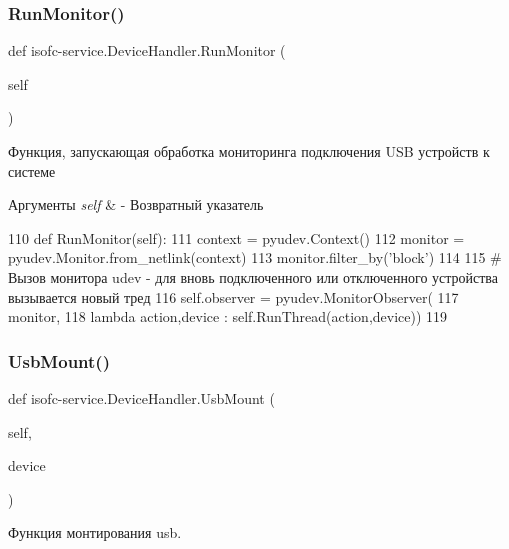 \subsubsection{\texorpdfstring{Run\+Monitor()}{RunMonitor()}}
{\footnotesize\ttfamily def isofc-\/service.\+Device\+Handler.\+Run\+Monitor (\begin{DoxyParamCaption}\item[{}]{self }\end{DoxyParamCaption})}



Функция, запускающая обработка мониторинга подключения U\+SB устройств к системе 


\begin{DoxyParams}{Аргументы}
{\em self} & -\/ Возвратный указатель \\
\hline
\end{DoxyParams}

\begin{DoxyCode}
110     \textcolor{keyword}{def }RunMonitor(self):
111         context = pyudev.Context()
112         monitor = pyudev.Monitor.from\_netlink(context)
113         monitor.filter\_by(\textcolor{stringliteral}{'block'})
114 
115         \textcolor{comment}{# Вызов монитора udev - для вновь подключенного или отключенного устройства вызывается новый тред}
116         self.observer = pyudev.MonitorObserver(
117             monitor,
118             \textcolor{keyword}{lambda} action,device : self.RunThread(action,device))
119 
\end{DoxyCode}
\mbox{\label{classisofc-service_1_1DeviceHandler_a1fac2973c2340523f8640b56974574cb}} 
\subsubsection{\texorpdfstring{Usb\+Mount()}{UsbMount()}}
{\footnotesize\ttfamily def isofc-\/service.\+Device\+Handler.\+Usb\+Mount (\begin{DoxyParamCaption}\item[{}]{self,  }\item[{}]{device }\end{DoxyParamCaption})}



Функция монтирования usb. 


